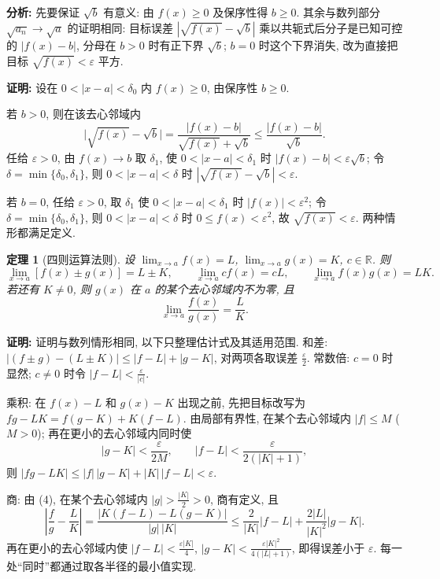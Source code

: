 \documentclass[UTF8,openany]{ctexbook}
\theoremstyle{chinesetextbook}
\newtheorem{theorem}{定理}[section]
\newenvironment{cnproof}{\par\indent\textbf{证明:} \ignorespaces}{\par}
\begin{document}
\par\indent\textbf{分析:} 先要保证 $\sqrt b$ 有意义: 由 $f(x)\ge0$ 及保序性得 $b\ge0$. 其余与数列部分 $\sqrt{a_n}\to\sqrt a$ 的证明相同: 目标误差 $|\sqrt{f(x)}-\sqrt b|$ 乘以共轭式后分子是已知可控的 $|f(x)-b|$, 分母在 $b>0$ 时有正下界 $\sqrt b$; $b=0$ 时这个下界消失, 改为直接把目标 $\sqrt{f(x)}<\varepsilon$ 平方.
\begin{cnproof}
设在 $0<|x-a|<\delta_0$ 内 $f(x)\ge0$, 由保序性 $b\ge0$.

若 $b>0$, 则在该去心邻域内
\[
\bigl|\sqrt{f(x)}-\sqrt b\bigr|
=\frac{|f(x)-b|}{\sqrt{f(x)}+\sqrt b}
\le\frac{|f(x)-b|}{\sqrt b}.
\]
任给 $\varepsilon>0$, 由 $f(x)\to b$ 取 $\delta_1$, 使 $0<|x-a|<\delta_1$ 时 $|f(x)-b|<\varepsilon\sqrt b$; 令 $\delta=\min\{\delta_0,\delta_1\}$, 则 $0<|x-a|<\delta$ 时 $|\sqrt{f(x)}-\sqrt b|<\varepsilon$.

若 $b=0$, 任给 $\varepsilon>0$, 取 $\delta_1$ 使 $0<|x-a|<\delta_1$ 时 $|f(x)|<\varepsilon^2$; 令 $\delta=\min\{\delta_0,\delta_1\}$, 则 $0<|x-a|<\delta$ 时 $0\le f(x)<\varepsilon^2$, 故 $\sqrt{f(x)}<\varepsilon$. 两种情形都满足定义.
\end{cnproof}
\begin{theorem}[四则运算法则]
设 $\displaystyle\lim_{x\to a}f(x)=L$, $\displaystyle\lim_{x\to a}g(x)=K$, $c\in\mathbb R$. 则
\[
\lim_{x\to a}[f(x)\pm g(x)]=L\pm K,\qquad
\lim_{x\to a}cf(x)=cL,\qquad
\lim_{x\to a}f(x)g(x)=LK.
\]
若还有 $K\ne0$, 则 $g(x)$ 在 $a$ 的某个去心邻域内不为零, 且
\[
\lim_{x\to a}\frac{f(x)}{g(x)}=\frac LK.
\]
\end{theorem}
\begin{cnproof}
证明与数列情形相同, 以下只整理估计式及其适用范围. 和差: $|(f\pm g)-(L\pm K)|\le|f-L|+|g-K|$, 对两项各取误差 $\displaystyle\frac\varepsilon2$. 常数倍: $c=0$ 时显然; $c\ne0$ 时令 $\displaystyle|f-L|<\frac\varepsilon{|c|}$.

乘积: 在 $f(x)-L$ 和 $g(x)-K$ 出现之前, 先把目标改写为 $fg-LK=f(g-K)+K(f-L)$. 由局部有界性, 在某个去心邻域内 $|f|\le M$ ($M>0$); 再在更小的去心邻域内同时使
\[
|g-K|<\frac\varepsilon{2M},\qquad |f-L|<\frac\varepsilon{2(|K|+1)},
\]
则 $|fg-LK|\le|f|\,|g-K|+|K|\,|f-L|<\varepsilon$.

商: 由 (4), 在某个去心邻域内 $\displaystyle|g|>\frac{|K|}2>0$, 商有定义, 且
\[
\left|\frac fg-\frac LK\right|
=\frac{|K(f-L)-L(g-K)|}{|g|\,|K|}
\le\frac2{|K|}|f-L|+\frac{2|L|}{|K|^2}|g-K|.
\]
再在更小的去心邻域内使 $\displaystyle|f-L|<\frac{\varepsilon|K|}4$, $\displaystyle|g-K|<\frac{\varepsilon|K|^2}{4(|L|+1)}$, 即得误差小于 $\varepsilon$. 每一处“同时”都通过取各半径的最小值实现.
\end{cnproof}
\end{document}
